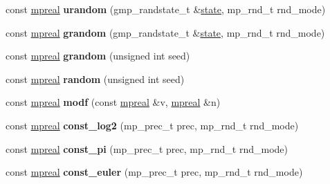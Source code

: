 \begin{DoxyCompactItemize}
\item 
\mbox{\label{classmpfr_1_1mpreal_a3150004a1bdaeb8511acb3a24d63e89c}} 
const \hyperlink{classmpfr_1_1mpreal}{mpreal} {\bfseries urandom} (gmp\+\_\+randstate\+\_\+t \&\hyperlink{structstate}{state}, mp\+\_\+rnd\+\_\+t rnd\+\_\+mode)
\item 
\mbox{\label{classmpfr_1_1mpreal_af3bd5ed3be90dc79fe2f91eb0e12f0d7}} 
const \hyperlink{classmpfr_1_1mpreal}{mpreal} {\bfseries grandom} (gmp\+\_\+randstate\+\_\+t \&\hyperlink{structstate}{state}, mp\+\_\+rnd\+\_\+t rnd\+\_\+mode)
\item 
\mbox{\label{classmpfr_1_1mpreal_a6d53807ca7acdd79c071aae83c628289}} 
const \hyperlink{classmpfr_1_1mpreal}{mpreal} {\bfseries grandom} (unsigned int seed)
\item 
\mbox{\label{classmpfr_1_1mpreal_a77253617c63bff689788ea87fb7bc12f}} 
const \hyperlink{classmpfr_1_1mpreal}{mpreal} {\bfseries random} (unsigned int seed)
\item 
\mbox{\label{classmpfr_1_1mpreal_ab5984116e4ff1e9056f21b8c76579861}} 
const \hyperlink{classmpfr_1_1mpreal}{mpreal} {\bfseries modf} (const \hyperlink{classmpfr_1_1mpreal}{mpreal} \&v, \hyperlink{classmpfr_1_1mpreal}{mpreal} \&n)
\item 
\mbox{\label{classmpfr_1_1mpreal_a14a6f8cb5938d03f09b1fce95c373fc9}} 
const \hyperlink{classmpfr_1_1mpreal}{mpreal} {\bfseries const\+\_\+log2} (mp\+\_\+prec\+\_\+t prec, mp\+\_\+rnd\+\_\+t rnd\+\_\+mode)
\item 
\mbox{\label{classmpfr_1_1mpreal_a88e3190a8cfb8458c5b08e9ebc6cfe84}} 
const \hyperlink{classmpfr_1_1mpreal}{mpreal} {\bfseries const\+\_\+pi} (mp\+\_\+prec\+\_\+t prec, mp\+\_\+rnd\+\_\+t rnd\+\_\+mode)
\item 
\mbox{\label{classmpfr_1_1mpreal_aee025a363356c1a693367c06b5837d0f}} 
const \hyperlink{classmpfr_1_1mpreal}{mpreal} {\bfseries const\+\_\+euler} (mp\+\_\+prec\+\_\+t prec, mp\+\_\+rnd\+\_\+t rnd\+\_\+mode)
\item 
\mbox{\label{classmpfr_1_1mpreal_a47ecddda73eabbd96fcf18b85335e343}} 

\end{DoxyCompactItemize}
